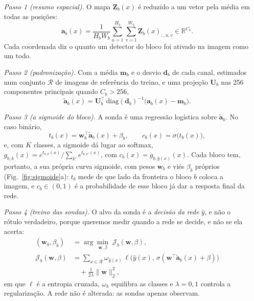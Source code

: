 \documentclass[conference,a4paper]{IEEEtran}
\begin{document}
\emph{Passo 1 (resumo espacial).} O mapa $\mathbf{Z}_b(x)$ é reduzido a um vetor pela média em todas as posições:
\begin{equation}
  \mathbf{a}_b(x) = \frac{1}{H_b W_b} \sum_{u=1}^{H_b}\sum_{v=1}^{W_b} \mathbf{Z}_b(x)_{:,u,v} \in \mathbb{R}^{C_b}.
\end{equation}
Cada coordenada diz o quanto um detector do bloco foi ativado na imagem como um todo.

\emph{Passo 2 (padronização).} Com a média $\mathbf{m}_b$ e o desvio $\mathbf{d}_b$ de cada canal, estimados num conjunto $\mathcal{R}$ de
imagens de referência do treino, e uma projeção $\mathbf{U}_b$ nas 256 componentes principais quando $C_b > 256$,
\begin{equation}
  \tilde{\mathbf{a}}_b(x) = \mathbf{U}_b^{\top}\,\mathrm{diag}(\mathbf{d}_b)^{-1}\big(\mathbf{a}_b(x) - \mathbf{m}_b\big).
\end{equation}

\emph{Passo 3 (a sigmoide do bloco).} A sonda é uma regressão logística sobre $\tilde{\mathbf{a}}_b$. No caso binário,
\begin{equation}
  t_b(x) = \mathbf{w}_b^{\top}\tilde{\mathbf{a}}_b(x) + \beta_b, \qquad c_b(x) = \sigma\big(t_b(x)\big),
  \label{eq:sonda}
\end{equation}
e, com $K$ classes, a sigmoide dá lugar ao softmax,
$g_{b,k}(x) = e^{t_{b,k}(x)}/\sum_{k'} e^{t_{b,k'}(x)}$, com $c_b(x) = g_{b,\hat y(x)}(x)$. Cada bloco tem, portanto, a sua própria curva
sigmoide, com pesos $\mathbf{w}_b$ e viés $\beta_b$ próprios (Fig.~\ref{fig:sigmoide}a): $t_b$ mede de que lado da fronteira o bloco $b$
coloca a imagem, e $c_b \in (0,1)$ é a probabilidade de esse bloco já dar a resposta final da rede.

\emph{Passo 4 (treino das sondas).} O alvo da sonda é a \emph{decisão da rede} $\hat y$, e não o rótulo verdadeiro, porque queremos medir
quando a rede se decide, e não se ela acerta:
\begin{align}
  (\mathbf{w}_b, \beta_b) &= \arg\min_{\mathbf{w},\beta}\; \mathcal{J}_b(\mathbf{w},\beta), \label{eq:treino_sonda}\\
  \mathcal{J}_b(\mathbf{w},\beta) &= \sum_{x \in \mathcal{R}} \omega_{\hat y(x)}\,
     \ell\big(\hat y(x),\, \sigma(\mathbf{w}^{\top}\tilde{\mathbf{a}}_b(x) + \beta)\big) \nonumber\\
     &\quad + \tfrac{1}{2\lambda}\lVert \mathbf{w} \rVert_2^2, \nonumber
\end{align}
em que $\ell$ é a entropia cruzada, $\omega_k$ equilibra as classes e $\lambda = 0{,}1$ controla a regularização. A rede não é alterada:
as sondas apenas observam.
\end{document}
